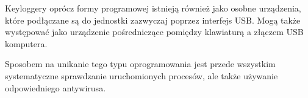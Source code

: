 \documentclass[12pt,twoside]{article}
\begin{document}
Keyloggery oprócz formy programowej istnieją również jako osobne urządzenia, które podłączane są do jednostki zazwyczaj poprzez interfejs USB. Mogą także występować jako urządzenie pośredniczące pomiędzy klawiaturą a złączem USB komputera. 

Sposobem na unikanie tego typu oprogramowania jest przede wszystkim systematyczne sprawdzanie uruchomionych procesów, ale także używanie odpowiedniego antywirusa.
\clearpage

\end{document}
